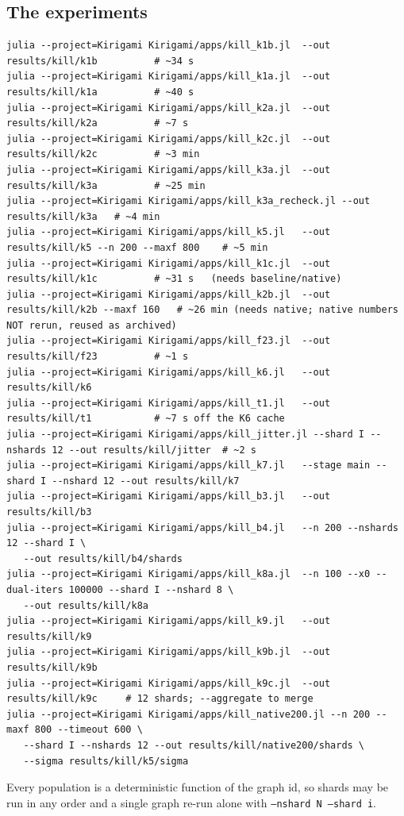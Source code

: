 \documentclass[11pt,a4paper]{article}
\theoremstyle{definition}
\newcommand{\file}[1]{\texttt{\small #1}}
\begin{document}
\subsection*{The experiments}
\begin{verbatim}
julia --project=Kirigami Kirigami/apps/kill_k1b.jl  --out results/kill/k1b          # ~34 s
julia --project=Kirigami Kirigami/apps/kill_k1a.jl  --out results/kill/k1a          # ~40 s
julia --project=Kirigami Kirigami/apps/kill_k2a.jl  --out results/kill/k2a          # ~7 s
julia --project=Kirigami Kirigami/apps/kill_k2c.jl  --out results/kill/k2c          # ~3 min
julia --project=Kirigami Kirigami/apps/kill_k3a.jl  --out results/kill/k3a          # ~25 min
julia --project=Kirigami Kirigami/apps/kill_k3a_recheck.jl --out results/kill/k3a   # ~4 min
julia --project=Kirigami Kirigami/apps/kill_k5.jl   --out results/kill/k5 --n 200 --maxf 800    # ~5 min
julia --project=Kirigami Kirigami/apps/kill_k1c.jl  --out results/kill/k1c          # ~31 s   (needs baseline/native)
julia --project=Kirigami Kirigami/apps/kill_k2b.jl  --out results/kill/k2b --maxf 160   # ~26 min (needs native; native numbers NOT rerun, reused as archived)
julia --project=Kirigami Kirigami/apps/kill_f23.jl  --out results/kill/f23          # ~1 s
julia --project=Kirigami Kirigami/apps/kill_k6.jl   --out results/kill/k6
julia --project=Kirigami Kirigami/apps/kill_t1.jl   --out results/kill/t1           # ~7 s off the K6 cache
julia --project=Kirigami Kirigami/apps/kill_jitter.jl --shard I --nshards 12 --out results/kill/jitter  # ~2 s
julia --project=Kirigami Kirigami/apps/kill_k7.jl   --stage main --shard I --nshard 12 --out results/kill/k7
julia --project=Kirigami Kirigami/apps/kill_b3.jl   --out results/kill/b3
julia --project=Kirigami Kirigami/apps/kill_b4.jl   --n 200 --nshards 12 --shard I \
   --out results/kill/b4/shards
julia --project=Kirigami Kirigami/apps/kill_k8a.jl  --n 100 --x0 --dual-iters 100000 --shard I --nshard 8 \
   --out results/kill/k8a
julia --project=Kirigami Kirigami/apps/kill_k9.jl   --out results/kill/k9
julia --project=Kirigami Kirigami/apps/kill_k9b.jl  --out results/kill/k9b
julia --project=Kirigami Kirigami/apps/kill_k9c.jl  --out results/kill/k9c     # 12 shards; --aggregate to merge
julia --project=Kirigami Kirigami/apps/kill_native200.jl --n 200 --maxf 800 --timeout 600 \
   --shard I --nshards 12 --out results/kill/native200/shards \
   --sigma results/kill/k5/sigma
\end{verbatim}
Every population is a deterministic function of the graph id, so shards may be run in any
order and a single graph re-run alone with \file{--nshard N --shard i}.
\end{document}
